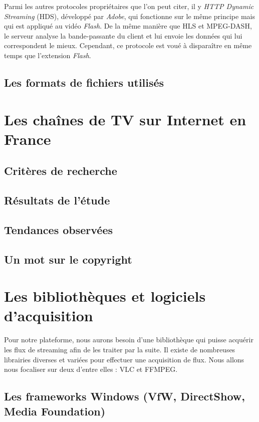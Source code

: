 \documentclass{polytech/polytech}
\begin{document}
Parmi les autres protocoles propriétaires que l’on peut citer, il y \textit{HTTP Dynamic Streaming} (HDS), développé par \textit{Adobe}, qui fonctionne sur le même principe mais qui est appliqué au vidéo \textit{Flash}. De la même manière que HLS et MPEG-DASH, le serveur analyse la bande-passante du client et lui envoie les données qui lui correspondent le mieux. Cependant, ce protocole est voué à disparaître en même temps que l’extension \textit{Flash}.


\section{Les formats de fichiers utilisés}


\chapter{Les chaînes de TV sur Internet en France}


\section{Critères de recherche}


\section{Résultats de l'étude}


\section{Tendances observées}


\section{Un mot sur le copyright}


\chapter{Les bibliothèques et logiciels d'acquisition}

Pour notre plateforme, nous aurons besoin d’une bibliothèque qui puisse acquérir les flux de streaming afin de les traiter par la suite. Il existe de nombreuses librairies diverses et variées pour effectuer une acquisition de flux. Nous allons nous focaliser sur deux d’entre elles : VLC et FFMPEG.

\section{Les frameworks Windows (VfW, DirectShow, Media Foundation)}
\end{document}
